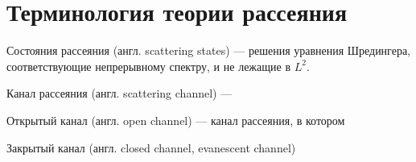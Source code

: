 \section{Терминология теории рассеяния}
Состояния рассеяния (англ. scattering states) — решения уравнения Шредингера, соответствующие непрерывному спектру, и не лежащие в $L^2$.

Канал рассеяния (англ. scattering channel) — \todo{} 

Открытый канал (англ. open channel) — канал рассеяния, в котором 

Закрытый канал (англ. closed channel, evanescent channel) \todo{}

